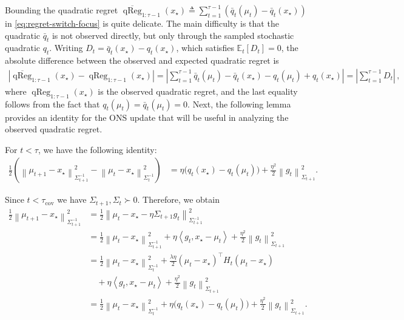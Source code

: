 \documentclass[12pt,cleveref]{jmlr}
\renewenvironment{proof}[1][\proofname]
{\par\noindent{\bfseries\upshape #1\ }}
{\jmlrQED}
\newcommand{\E}{\mathbb E}
\newcommand{\1}{\mathbf 1}
\newcommand{\ip}[2]{\left\langle #1,#2\right\rangle}
\newcommand{\normm}[2]{\left\lVert #1\right\rVert_{#2}}
\begin{document}
Bounding the quadratic regret $
\overline{\operatorname{qReg}}_{1:\tau -1}(x_{\star})
\triangleq
\sum_{t=1}^{\tau -1}
\left(\bar{q}_t(\mu_t)-\bar{q}_t(x_{\star})\right)
$ in \cref{eq:regret-switch-focus} is quite delicate.
The main difficulty is that the quadratic $\bar{q}_t$ is not observed directly, but only through the sampled stochastic quadratic $q_t$.
Writing $D_t=\bar{q}_t(x_{\star})-q_t(x_{\star})$, which satisfies $\E_t[D_t]=0$,
the absolute difference between the observed and expected quadratic regret is
\begin{align}
    \left|
    \overline{\operatorname{qReg}}_{1:\tau-1}(x_{\star})-\operatorname{qReg}_{1:\tau-1}(x_{\star})
    \right|
    =
    \left|
    \sum_{t=1}^{\tau -1}
    \bar{q}_t(\mu_t) - \bar{q}_t(x_{\star})
    -
    q_t(\mu_t) + q_t(x_{\star})
    \right|
    =
    \left|
    \sum_{t=1}^{\tau-1}
    D_t
    \right|\,,
\end{align}
where $\operatorname{qReg}_{1:\tau-1}(x_{\star})$ is the observed quadratic regret,
and the last equality follows from the fact that $q_t(\mu_t)=\bar{q}_t(\mu_t)=0$.
Next, the following lemma provides an identity for the ONS update that will be useful in analyzing the observed quadratic regret.
\begin{lemma}
    \label{lem:ons-identity}
    For $t < \tau$, we have the following identity:
    \begin{align}
        \frac12
        \left(\normm{\mu_{t+1}-x_\star}{\Sigma_{t+1}^{-1}}^2
            -\normm{\mu_t-x_\star}{\Sigma_t^{-1}}^2
        \right)
        & =
        \eta\bigl(q_t(x_\star)-q_t(\mu_t)\bigr)
        +\frac{\eta^2}{2}\normm{g_t}{\Sigma_{t+1}}^2.
    \end{align}
\end{lemma}
\begin{proof}
    Since $t < \tau_{\mathrm{cov}}$ we have $\Sigma_{t+1}, \Sigma_t \succ 0$.
    Therefore, we obtain
    \begin{align}
        \frac12\normm{\mu_{t+1}-x_\star}{\Sigma_{t+1}^{-1}}^2
        & =\frac12\normm{\mu_t-x_\star-\eta\Sigma_{t+1}g_t}
        {\Sigma_{t+1}^{-1}}^2                                                   \\
        & =\frac12\normm{\mu_t-x_\star}{\Sigma_{t+1}^{-1}}^2
        +\eta\ip{g_t}{x_\star-\mu_t}
        +\frac{\eta^2}{2}\normm{g_t}{\Sigma_{t+1}}^2                            \\
        & =\frac12\normm{\mu_t-x_\star}{\Sigma_t^{-1}}^2
        +\frac{\lambda\eta}{2}(\mu_t-x_\star)^\top H_t (\mu_t-x_\star)\nonumber \\
        & \quad +\eta\ip{g_t}{x_\star-\mu_t}
        +\frac{\eta^2}{2}\normm{g_t}{\Sigma_{t+1}}^2                            \\
        & =\frac12\normm{\mu_t-x_\star}{\Sigma_t^{-1}}^2
        +\eta\bigl(q_t(x_\star)-q_t(\mu_t)\bigr)
        +\frac{\eta^2}{2}\normm{g_t}{\Sigma_{t+1}}^2.
    \end{align}
\end{proof}
\end{document}

